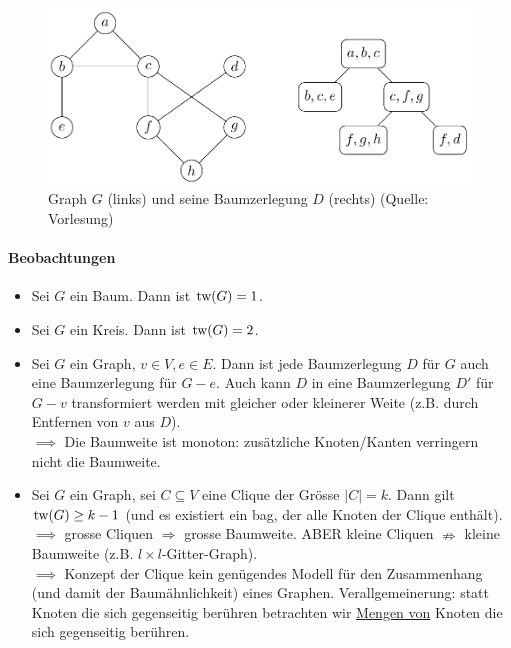 \begin{figure}[h]
    \centering
    \includegraphics[scale=0.4]{images/tree-decomp.png}
    \caption{Graph $G$ (links) und seine Baumzerlegung $D$ (rechts) (Quelle: Vorlesung)}
    \label{fig:tree-decomp}
\end{figure}

\paragraph{Beobachtungen}
\begin{itemize}
    \item Sei $G$ ein Baum. Dann ist $\text{tw}(G) = 1$.
    \item Sei $G$ ein Kreis. Dann ist $\text{tw}(G) = 2$.
    \item Sei $G$ ein Graph, $v \in V, e \in E$.
    Dann ist jede Baumzerlegung $D$ für $G$ auch eine Baumzerlegung für $G-e$.
    Auch kann $D$ in eine Baumzerlegung $D'$ für $G-v$ transformiert werden mit gleicher oder kleinerer Weite
    (z.B. durch Entfernen von $v$ aus $D$).
    \\
    $\implies$ Die Baumweite ist monoton: zusätzliche Knoten/Kanten verringern nicht die Baumweite.
    \item Sei $G$ ein Graph, sei $C \subseteq V$ eine Clique der Grösse $|C| = k$.
    Dann gilt $\text{tw}(G) \geq k-1$ (und es existiert ein bag, der alle Knoten der Clique enthält).
    \\
    $\implies$ grosse Cliquen $\Rightarrow$ grosse Baumweite.
    ABER kleine Cliquen $\nRightarrow$ kleine Baumweite (z.B. $l \times l$-Gitter-Graph).
    \\
    $\implies$ Konzept der Clique kein genügendes Modell für den Zusammenhang
    (und damit der Baumähnlichkeit) eines Graphen.
    Verallgemeinerung: statt Knoten die sich gegenseitig berühren betrachten wir
    \underline{Mengen von} Knoten die sich gegenseitig berühren.
\end{itemize}

